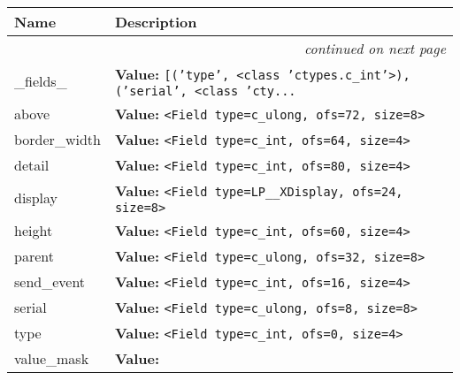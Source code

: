     \vspace{-1cm}
\hspace{\varindent}\begin{longtable}{|p{\varnamewidth}|p{\vardescrwidth}|l}
\cline{1-2}
\cline{1-2} \centering \textbf{Name} & \centering \textbf{Description}& \\
\cline{1-2}
\endhead\cline{1-2}\multicolumn{3}{r}{\small\textit{continued on next page}}\\\endfoot\cline{1-2}
\endlastfoot\raggedright \_\-f\-i\-e\-l\-d\-s\-\_\- & \raggedright \textbf{Value:} 
{\tt \texttt{[}\texttt{(}\texttt{'}\texttt{type}\texttt{'}\texttt{, }{\textless}class 'ctypes.c\_int'{\textgreater}\texttt{)}\texttt{, }\texttt{(}\texttt{'}\texttt{serial}\texttt{'}\texttt{, }{\textless}class 'cty\texttt{...}}&\\
\cline{1-2}
\raggedright a\-b\-o\-v\-e\- & \raggedright \textbf{Value:} 
{\tt {\textless}Field type=c\_ulong, ofs=72, size=8{\textgreater}}&\\
\cline{1-2}
\raggedright b\-o\-r\-d\-e\-r\-\_\-w\-i\-d\-t\-h\- & \raggedright \textbf{Value:} 
{\tt {\textless}Field type=c\_int, ofs=64, size=4{\textgreater}}&\\
\cline{1-2}
\raggedright d\-e\-t\-a\-i\-l\- & \raggedright \textbf{Value:} 
{\tt {\textless}Field type=c\_int, ofs=80, size=4{\textgreater}}&\\
\cline{1-2}
\raggedright d\-i\-s\-p\-l\-a\-y\- & \raggedright \textbf{Value:} 
{\tt {\textless}Field type=LP\_\_XDisplay, ofs=24, size=8{\textgreater}}&\\
\cline{1-2}
\raggedright h\-e\-i\-g\-h\-t\- & \raggedright \textbf{Value:} 
{\tt {\textless}Field type=c\_int, ofs=60, size=4{\textgreater}}&\\
\cline{1-2}
\raggedright p\-a\-r\-e\-n\-t\- & \raggedright \textbf{Value:} 
{\tt {\textless}Field type=c\_ulong, ofs=32, size=8{\textgreater}}&\\
\cline{1-2}
\raggedright s\-e\-n\-d\-\_\-e\-v\-e\-n\-t\- & \raggedright \textbf{Value:} 
{\tt {\textless}Field type=c\_int, ofs=16, size=4{\textgreater}}&\\
\cline{1-2}
\raggedright s\-e\-r\-i\-a\-l\- & \raggedright \textbf{Value:} 
{\tt {\textless}Field type=c\_ulong, ofs=8, size=8{\textgreater}}&\\
\cline{1-2}
\raggedright t\-y\-p\-e\- & \raggedright \textbf{Value:} 
{\tt {\textless}Field type=c\_int, ofs=0, size=4{\textgreater}}&\\
\cline{1-2}
\raggedright v\-a\-l\-u\-e\-\_\-m\-a\-s\-k\- & \raggedright \textbf{Value:} 

\end{longtable}
